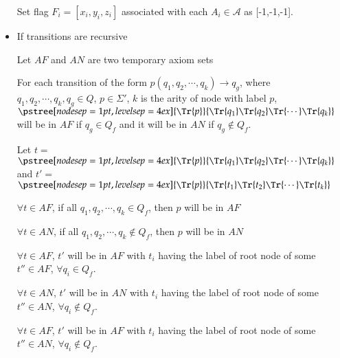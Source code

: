 \begin{itemize}
		Set flag $F_i=[x_i,y_i,z_i]$ associated with each $A_i\in\mathcal{A}$ as  [-1,-1,-1].
	\item If transitions are recursive

		Let $AF$ and $AN$ are two temporary axiom sets
		
		For each transition of the form $p(q_1,q_2,\cdots ,q_k)\rightarrow q_g$, where  $q_1,q_2,\cdots ,q_k,q_g\in Q$, $p\in \Sigma '$, 
		$k$ is the arity of node with label $p$,
		{\tiny
		$
		\pstree[nodesep=1pt,levelsep=4ex]{\Tr{p}}
        	{
            		\Tr{q_1}
            		\Tr{q_2}
			\Tr{\cdots }
			\Tr{q_k}
	        }
		$} will be in $AF$ if  $q_g\in Q_f$ and it will be in $AN$ if $q_g\notin Q_f$.
\begin{comment}

		For each transition of the form $p(q_1,q_2,\cdots ,q_k)\rightarrow q_g$, where  $q_1,q_2,\cdots ,q_g\in Q$, $p\in \Sigma '$, 
		$k$ is the arity of node with label $p$ and $q_g\notin Q_f$ 
		{\small
		$
		\pstree[nodesep=1pt,levelsep=4ex]{\Tr{p}}
        	{
            		\Tr{q_1}
            		\Tr{q_2}
			\Tr{\cdots }
			\Tr{q_k}
	        }
		$}$\in AN $
\end{comment}		
		
		Let $t=$
		{\tiny
		$
		\pstree[nodesep=1pt,levelsep=4ex]{\Tr{p}}
        	{
            		\Tr{q_1}
            		\Tr{q_2}
			\Tr{\cdots }
			\Tr{q_k}
	        }
		$}%
		and $t'=$
		{\tiny
		$
		\pstree[nodesep=1pt,levelsep=4ex]{\Tr{p}}
        	{
            		\Tr{t_1}
            		\Tr{t_2}
			\Tr{\cdots }
			\Tr{t_k}
	        }
		$}%

	$\forall t\in AF$, if  all  $q_1,q_2,\cdots ,q_k\in Q_f$, then $p$ will be in $AF$

	$\forall t\in AN$, if  all  $q_1,q_2,\cdots ,q_k\notin Q_f$, then $p$ will be in $AN$

	$\forall t\in AF$,  $t'$ will be in $AF$ with $t_i$ having the label of root node of some $t''\in AF$, $\forall q_i\in Q_f$. 

	$\forall t\in AN$,  $t'$ will be in $AN$ with $t_i$ having the label of root node of some $t''\in AN$, $\forall q_i\notin Q_f$. 

	$\forall t\in AF$,  $t'$ will be in $AF$ with $t_i$ having the label of root node of some $t''\in AN$, $\forall q_i\notin Q_f$. 


\end{itemize}
